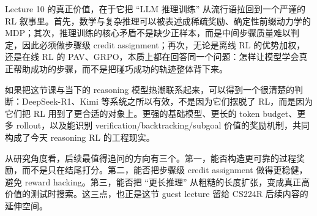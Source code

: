 \documentclass[a4paper]{article}
\begin{document}
Lecture 10 的真正价值，在于它把 ``LLM 推理训练'' 从流行语拉回到一个严谨的 RL 叙事里。首先，数学与复杂推理可以被表述成稀疏奖励、确定性前缀动力学的 MDP；其次，推理训练的核心矛盾不是缺少正样本，而是中间步骤质量难以判定，因此必须做步骤级 credit assignment；再次，无论是离线 RL 的优势加权，还是在线 RL 的 PAV、GRPO，本质上都在回答同一个问题：怎样让模型学会真正帮助成功的步骤，而不是把碰巧成功的轨迹整体背下来。

如果把这节课与当下的 reasoning 模型热潮联系起来，可以得到一个很清楚的判断：DeepSeek-R1、Kimi 等系统之所以有效，不是因为它们摆脱了 RL，而是因为它们把 RL 用到了更合适的对象上。更强的基础模型、更长的 token budget、更多 rollout，以及能识别 verification/backtracking/subgoal 价值的奖励机制，共同构成了今天 reasoning RL 的工程现实。

从研究角度看，后续最值得追问的方向有三个。第一，能否构造更可靠的过程奖励，而不是只在结尾打分。第二，能否把步骤级 credit assignment 做得更稳健，避免 reward hacking。第三，能否把 ``更长推理'' 从粗糙的长度扩张，变成真正高价值的测试时搜索。这三点，也正是这节 guest lecture 留给 CS224R 后续内容的延伸空间。
\end{document}
